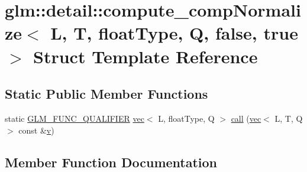 \hypertarget{structglm_1_1detail_1_1compute__comp_normalize_3_01_l_00_01_t_00_01float_type_00_01_q_00_01false_00_01true_01_4}{}\section{glm\+:\+:detail\+:\+:compute\+\_\+comp\+Normalize$<$ L, T, float\+Type, Q, false, true $>$ Struct Template Reference}
\label{structglm_1_1detail_1_1compute__comp_normalize_3_01_l_00_01_t_00_01float_type_00_01_q_00_01false_00_01true_01_4}
\subsection*{Static Public Member Functions}
\begin{DoxyCompactItemize}
\item 
static \mbox{\hyperlink{setup_8hpp_a33fdea6f91c5f834105f7415e2a64407}{G\+L\+M\+\_\+\+F\+U\+N\+C\+\_\+\+Q\+U\+A\+L\+I\+F\+I\+ER}} \mbox{\hyperlink{structglm_1_1vec}{vec}}$<$ L, float\+Type, Q $>$ \mbox{\hyperlink{structglm_1_1detail_1_1compute__comp_normalize_3_01_l_00_01_t_00_01float_type_00_01_q_00_01false_00_01true_01_4_ac4106152eca812bf0f16045bfccdb3d6}{call}} (\mbox{\hyperlink{structglm_1_1vec}{vec}}$<$ L, T, Q $>$ const \&\mbox{\hyperlink{_s_d_l__opengl_8h_a10a82eabcb59d2fcd74acee063775f90}{v}})
\end{DoxyCompactItemize}


\subsection{Member Function Documentation}
\mbox{\label{structglm_1_1detail_1_1compute__comp_normalize_3_01_l_00_01_t_00_01float_type_00_01_q_00_01false_00_01true_01_4_ac4106152eca812bf0f16045bfccdb3d6}} 
